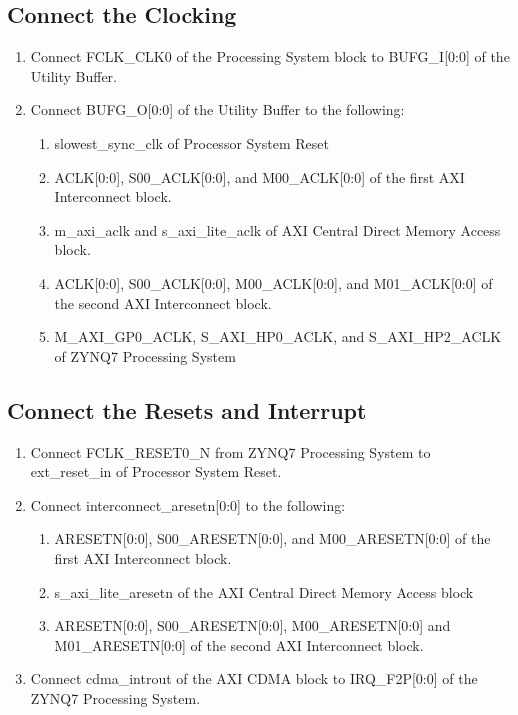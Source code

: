 \documentclass[12pt]{article}
\begin{document}
\subsection{Connect the Clocking}
\begin{enumerate}
\item Connect FCLK\_CLK0 of the Processing System block to BUFG\_I[0:0] of the Utility Buffer.
\item Connect BUFG\_O[0:0] of the Utility Buffer to the following:
\begin{enumerate}
\item slowest\_sync\_clk of Processor System Reset
\item ACLK[0:0], S00\_ACLK[0:0], and M00\_ACLK[0:0] of the first AXI Interconnect block.
\item m\_axi\_aclk and s\_axi\_lite\_aclk of AXI Central Direct Memory Access block.
\item ACLK[0:0], S00\_ACLK[0:0], M00\_ACLK[0:0], and M01\_ACLK[0:0] of the second AXI Interconnect block.
\item M\_AXI\_GP0\_ACLK, S\_AXI\_HP0\_ACLK, and S\_AXI\_HP2\_ACLK of ZYNQ7 Processing System
\end{enumerate}
\end{enumerate}

\subsection{Connect the Resets and Interrupt}
\begin{enumerate}
\item Connect FCLK\_RESET0\_N from ZYNQ7 Processing System to ext\_reset\_in of Processor System Reset.
\item Connect interconnect\_aresetn[0:0] to the following:
\begin{enumerate}
\item ARESETN[0:0], S00\_ARESETN[0:0], and M00\_ARESETN[0:0] of the first AXI Interconnect block.
\item s\_axi\_lite\_aresetn of the AXI Central Direct Memory Access block
\item ARESETN[0:0], S00\_ARESETN[0:0], M00\_ARESETN[0:0] and M01\_ARESETN[0:0] of the second AXI Interconnect block.
\end{enumerate}
\item Connect cdma\_introut of the AXI CDMA block to IRQ\_F2P[0:0] of the ZYNQ7 Processing System.
\end{enumerate}
\end{document}

